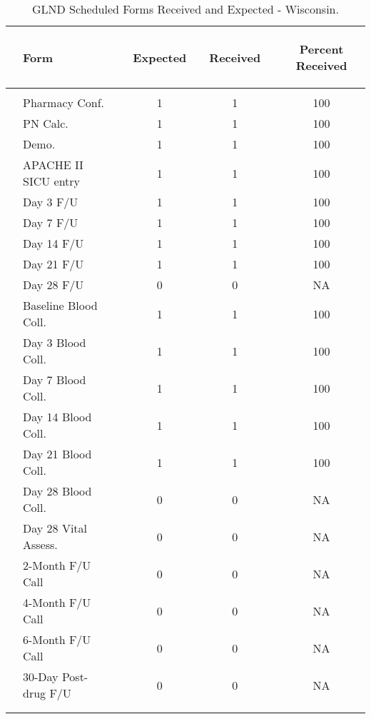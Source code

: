 \documentclass[dvips,10pt]{article}
\begin{document}
\begin{table}[t]
\caption
{ GLND Scheduled Forms Received and Expected - Wisconsin. }
\begin{center}
\begin{tabular}{ @{}l@{}
@{}l@{}@{}p{1.5em}@{}@{}c@{}@{}p{1.5em}@{}@{}c@{}@{}p{1.5em}@{}@{}c@{}
}
\hline

& \parbox{6em}{\begin{center}Form\end{center}} && \parbox{6em}{\begin{center}Expected\end{center}} && \parbox{6em}{\begin{center}Received\end{center}} && \parbox{6em}{\begin{center}Percent Received\end{center}} \\

\hline

\\
& Pharmacy Conf. && 1 && 1 && 100 \\
& PN Calc. && 1 && 1 && 100 \\
& Demo. && 1 && 1 && 100 \\
& APACHE II SICU entry && 1 && 1 && 100 \\
& Day 3 F/U && 1 && 1 && 100 \\
& Day 7 F/U && 1 && 1 && 100 \\
& Day 14 F/U && 1 && 1 && 100 \\
& Day 21 F/U && 1 && 1 && 100 \\
& Day 28 F/U && 0 && 0 && NA \\
& Baseline Blood Coll. && 1 && 1 && 100 \\
& Day 3 Blood Coll. && 1 && 1 && 100 \\
& Day 7 Blood Coll. && 1 && 1 && 100 \\
& Day 14 Blood Coll. && 1 && 1 && 100 \\
& Day 21 Blood Coll. && 1 && 1 && 100 \\
& Day 28 Blood Coll. && 0 && 0 && NA \\
& Day 28 Vital Assess. && 0 && 0 && NA \\
& 2-Month F/U Call && 0 && 0 && NA \\
& 4-Month F/U Call && 0 && 0 && NA \\
& 6-Month F/U Call && 0 && 0 && NA \\
& 30-Day Post-drug F/U && 0 && 0 && NA \\
\\
\hline \\

\end{tabular}

\end{center}
 \end{table}
\end{document}
